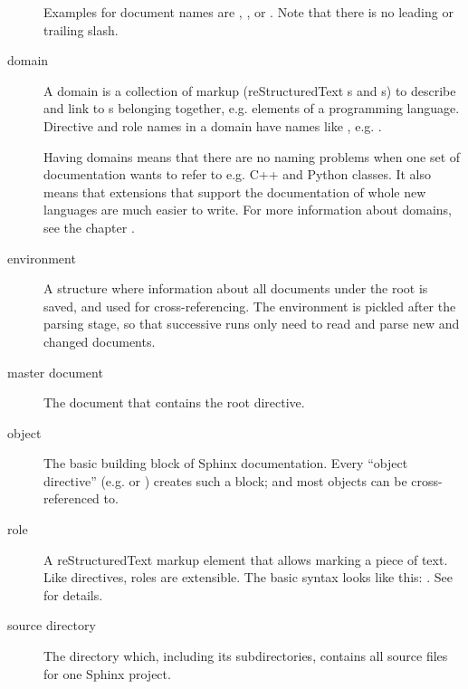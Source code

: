 \documentclass[letterpaper,10pt,english]{sphinxmanual}
\begin{document}
\begin{description}
Examples for document names are , , or
.  Note that there is no leading or trailing
slash.

\item[{domain\index{domain|textbf}}] \leavevmode{}\label{glossary:term-domain}
A domain is a collection of markup (reStructuredText {\hyperref[glossary:term\string-directive]{}}s
and {\hyperref[glossary:term\string-role]{}}s) to describe and link to {\hyperref[glossary:term\string-object]{}}s belonging
together, e.g. elements of a programming language.  Directive and role
names in a domain have names like , e.g. .

Having domains means that there are no naming problems when one set of
documentation wants to refer to e.g. C++ and Python classes.  It also
means that extensions that support the documentation of whole new
languages are much easier to write.  For more information about domains,
see the chapter {\hyperref[domains:domains]{}}.

\item[{environment\index{environment|textbf}}] \leavevmode{}\label{glossary:term-environment}
A structure where information about all documents under the root is saved,
and used for cross-referencing.  The environment is pickled after the
parsing stage, so that successive runs only need to read and parse new and
changed documents.

\item[{master document\index{master document|textbf}}] \leavevmode{}\label{glossary:term-master-document}
The document that contains the root {\hyperref[markup/toctree:directive\string-toctree]{}} directive.

\item[{object\index{object|textbf}}] \leavevmode{}\label{glossary:term-object}
The basic building block of Sphinx documentation.  Every ``object
directive'' (e.g.  or {\hyperref[domains:directive\string-object]{}}) creates such a block;
and most objects can be cross-referenced to.

\item[{role\index{role|textbf}}] \leavevmode{}\label{glossary:term-role}
A reStructuredText markup element that allows marking a piece of text.
Like directives, roles are extensible.  The basic syntax looks like this:
.  See {\hyperref[rest:inlinemarkup]{}} for details.

\item[{source directory\index{source directory|textbf}}] \leavevmode{}\label{glossary:term-source-directory}
The directory which, including its subdirectories, contains all source
files for one Sphinx project.

\end{description}
\end{document}
